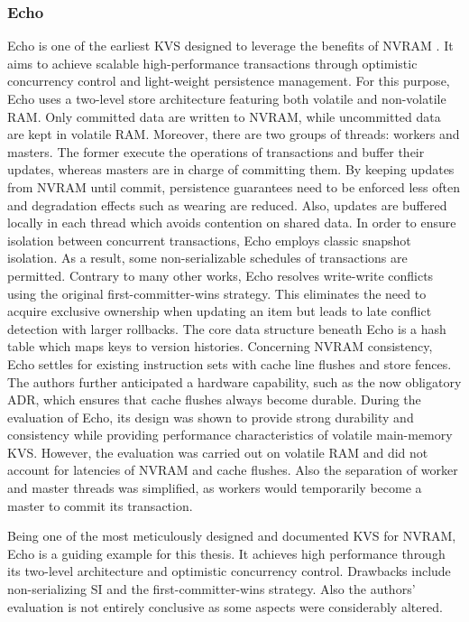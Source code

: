 \subsubsection{Echo}

Echo is one of the earliest KVS designed to leverage the benefits of NVRAM
\cite{bailey2013exploring}. It aims to achieve scalable high-performance
transactions through optimistic concurrency control and light-weight persistence
management. For this purpose, Echo uses a two-level store architecture featuring
both volatile and non-volatile RAM. Only committed data are written to NVRAM,
while uncommitted data are kept in volatile RAM. Moreover, there are two groups
of threads: workers and masters. The former execute the operations of
transactions and buffer their updates, whereas masters are in charge of
committing them. By keeping updates from NVRAM until commit, persistence
guarantees need to be enforced less often and degradation effects such as
wearing are reduced. Also, updates are buffered locally in each thread which
avoids contention on shared data. In order to ensure isolation between
concurrent transactions, Echo employs classic snapshot isolation. As a result,
some non-serializable schedules of transactions are permitted. Contrary to many
other works, Echo resolves write-write conflicts using the original
first-committer-wins strategy. This eliminates the need to acquire exclusive
ownership when updating an item but leads to late conflict detection with larger
rollbacks. The core data structure beneath Echo is a hash table which maps keys
to version histories. Concerning NVRAM consistency, Echo settles for existing
instruction sets with cache line flushes and store fences. The authors further
anticipated a hardware capability, such as the now obligatory ADR, which ensures
that cache flushes always become durable. During the evaluation of Echo, its
design was shown to provide strong durability and consistency while providing
performance characteristics of volatile main-memory KVS. However, the evaluation
was carried out on volatile RAM and did not account for latencies of NVRAM and
cache flushes. Also the separation of worker and master threads was simplified,
as workers would temporarily become a master to commit its transaction.

Being one of the most meticulously designed and documented KVS for NVRAM, Echo
is a guiding example for this thesis. It achieves high performance through its
two-level architecture and optimistic concurrency control. Drawbacks include
non-serializing SI and the first-committer-wins strategy. Also the authors'
evaluation is not entirely conclusive as some aspects were considerably altered.

